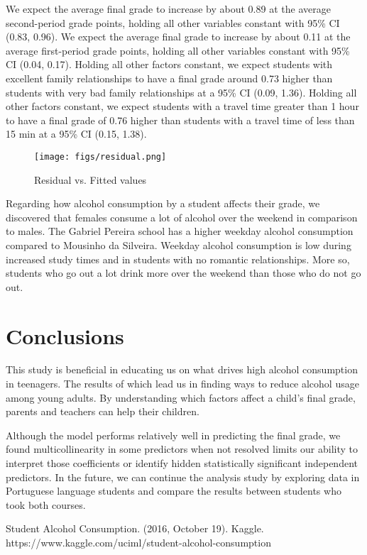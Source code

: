\documentclass[11pt]{article}
\begin{document}
We expect the average final grade to increase by about 0.89 at the average second-period grade points, holding all other variables constant with 95\% CI (0.83, 0.96). \newline
We expect the average final grade to increase by about 0.11 at the average first-period grade points, holding all other variables constant with 95\% CI (0.04, 0.17).\newline
Holding all other factors constant, we expect students with excellent family relationships to have a final grade around  0.73 higher than students with very bad family relationships at a 95\% CI (0.09, 1.36).\newline
Holding all other factors constant, we expect students with a travel time greater than 1 hour to have a final grade of  0.76 higher than students with a travel time of less than 15 min at a 95\% CI (0.15, 1.38).

\begin{figure}
	\centering
	\texttt{[image: figs/residual.png]}
	\caption{Residual vs. Fitted values}
	\label{fig:fig3}
\end{figure}

Regarding how alcohol consumption by a student affects their grade, we discovered that females consume a lot of alcohol over the weekend in comparison to males. 
The Gabriel Pereira school has a higher weekday alcohol consumption compared to Mousinho da Silveira. Weekday alcohol consumption is low during increased study times and in students with no romantic relationships. More so, students who go out a lot drink more over the weekend than those who do not go out.


\section{Conclusions}
This study is beneficial in educating us on what drives high alcohol consumption in teenagers. The results of which lead us in finding ways to reduce alcohol usage among young adults. By understanding which factors affect a child's final grade, parents and teachers can help their children.

Although the model performs relatively well in predicting the final grade, we found multicollinearity in some predictors when not resolved limits our ability to interpret those coefficients or identify hidden statistically significant independent predictors. 
\newline
In the future, we can continue the analysis study by exploring data in Portuguese language students and compare the results between students who took both courses.

\begin{thebibliography}{1}
Student Alcohol Consumption. (2016, October 19). Kaggle. https://www.kaggle.com/uciml/student-alcohol-consumption
\end{thebibliography}
\end{document}

